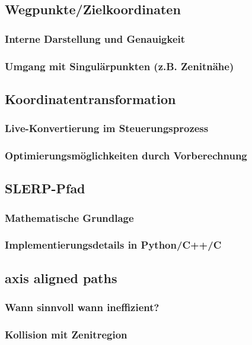 \subsection{Wegpunkte/Zielkoordinaten}

\subsubsection{Interne Darstellung und Genauigkeit}
\subsubsection{Umgang mit Singulärpunkten (z.B. Zenitnähe)}


\subsection{Koordinatentransformation}

\subsubsection{Live-Konvertierung im Steuerungsprozess}
\subsubsection{Optimierungsmöglichkeiten durch Vorberechnung}

\subsection{SLERP-Pfad}

\subsubsection{Mathematische Grundlage}
\subsubsection{Implementierungsdetails in Python/C++/C}

\subsection{axis aligned paths}

\subsubsection{Wann sinnvoll \textendash wann ineffizient?}
\subsubsection{Kollision mit Zenitregion}

